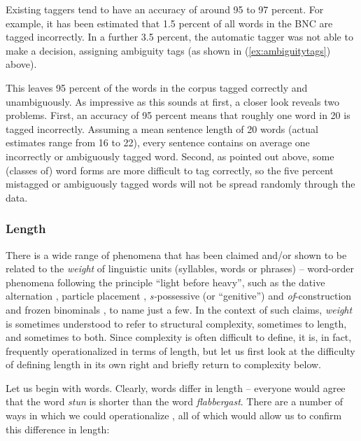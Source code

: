Existing taggers tend to have an accuracy of around 95 to 97 percent. For example, it has been estimated \citep{leech_claws4:_1994} that 1.5 percent of all words in the BNC  are tagged incorrectly. In a further 3.5 percent, the automatic tagger was not able to make a decision, assigning ambiguity  tags (as shown in (\ref{ex:ambiguitytags}) above).

This leaves 95 percent of the words in the corpus tagged  correctly and unambiguously. As impressive as this sounds at first, a closer look reveals two problems. First, an accuracy of 95 percent means that roughly one word in 20 is tagged incorrectly. Assuming a mean  sentence length  of 20 words (actual estimates range from 16 to 22), every sentence contains on average one incorrectly or ambiguously  tagged  word. Second, as pointed out above, some (classes of) word forms are more difficult to tag correctly, so the five percent mistagged or ambiguously tagged words will not be spread randomly through the data.

\subsubsection{Length}
\label{sec:operationalizinglength}

There is a wide range of phenomena that has been claimed and\slash or shown to be related to the \textit{weight}  of linguistic units (syllables,  words or phrases) -- word\hyp{}order phenomena following the principle ``light before heavy'', such as the dative  alternation  \citep{thompson_iconicity_1987}, particle placement \citep{chen_discourse_1986}, \textit{s-}possessive  (or ``genitive'') and \textit{of}-construction \citep{deane_english_1987} and frozen  binominals \citep{sobkowiak_unmarked-before-marked_1993}, to name just a few. In the context of such claims, \textit{weight}  is sometimes understood to refer to structural complexity,  sometimes to length,  and sometimes to both. Since complexity is often difficult to define, it is, in fact, frequently operationalized  in terms of length, but let us first look at the difficulty of defining length in its own right and briefly return to complexity  below.

Let us begin with words. Clearly, words differ in length  -- everyone would agree that the word \textit{stun} is shorter than the word \textit{flabbergast}. There are a number of ways in which we could operationalize  , all of which would allow us to confirm this difference in  length:

